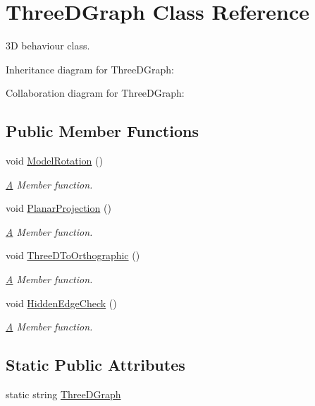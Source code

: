\hypertarget{classThreeDGraph}{}\section{Three\+D\+Graph Class Reference}
\label{classThreeDGraph}


3D behaviour class.  




Inheritance diagram for Three\+D\+Graph\+:


Collaboration diagram for Three\+D\+Graph\+:
\subsection*{Public Member Functions}
\begin{DoxyCompactItemize}
\item 
void \hyperlink{classThreeDGraph_abc739a0c4de5c007b113558992d96968}{Model\+Rotation} ()
\begin{DoxyCompactList}\small\item\em \hyperlink{classA}{A} Member function. \end{DoxyCompactList}\item 
void \hyperlink{classThreeDGraph_a89922d3d78cdc0152dfd2974e66e7d5d}{Planar\+Projection} ()
\begin{DoxyCompactList}\small\item\em \hyperlink{classA}{A} Member function. \end{DoxyCompactList}\item 
void \hyperlink{classThreeDGraph_a7f484956c7d616b6724e758ed43e5bed}{Three\+D\+To\+Orthographic} ()
\begin{DoxyCompactList}\small\item\em \hyperlink{classA}{A} Member function. \end{DoxyCompactList}\item 
void \hyperlink{classThreeDGraph_a33b4bb0d5a42dba80e987b3d709347a0}{Hidden\+Edge\+Check} ()
\begin{DoxyCompactList}\small\item\em \hyperlink{classA}{A} Member function. \end{DoxyCompactList}\end{DoxyCompactItemize}
\subsection*{Static Public Attributes}
\begin{DoxyCompactItemize}
\item 
static string \hyperlink{classThreeDGraph_ab2553252d92e1a3e81e58b81ef95220a}{Three\+D\+Graph}
\end{DoxyCompactItemize}


